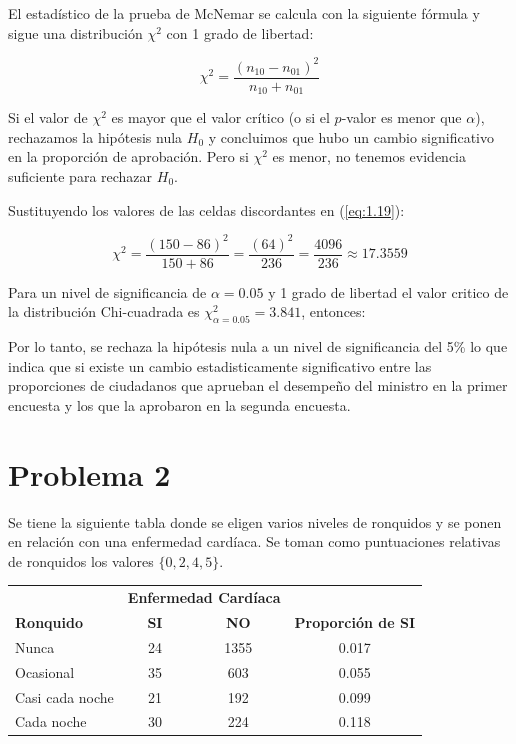 \newpage
El estadístico de la prueba de McNemar se calcula con la siguiente fórmula y sigue una distribución $\chi^2$ con 1 grado de libertad:

\begin{equation}
    \chi^2 = \frac{(n_{10} - n_{01})^2}{n_{10} + n_{01}}
    \label{eq:1.19}
\end{equation}

Si el valor de $\chi^2$ es mayor que el valor crítico (o si el $p$-valor es menor que $\alpha$), rechazamos la hipótesis nula $H_0$ y concluimos que hubo un cambio significativo en la proporción de aprobación. Pero si $\chi^2$ es menor, no tenemos evidencia suficiente para rechazar $H_0$.

Sustituyendo los valores de las celdas discordantes en (\ref{eq:1.19}):

\begin{equation*}
    \chi^2 = \frac{(150 - 86)^2}{150 + 86} = \frac{(64)^2}{236} = \frac{4096}{236}\approx 17.3559
\end{equation*}

Para un nivel de significancia de $\alpha=0.05$ y 1 grado de libertad el valor critico de la distribución Chi-cuadrada es $\chi^2_{\alpha=0.05}=3.841$, entonces:

\begin{center}
\end{center}

Por lo tanto, se rechaza la hipótesis nula a un nivel de significancia del 5\% lo que indica que si existe un cambio estadisticamente significativo entre las proporciones de ciudadanos que aprueban el desempeño del ministro en la primer encuesta y los que la aprobaron en la segunda encuesta.

\newpage

\section*{Problema \textcolor{CIMATRed}{2}}

Se tiene la siguiente tabla donde se eligen varios niveles de ronquidos y se ponen en relación con una enfermedad cardíaca. Se toman como puntuaciones relativas de ronquidos los valores $\{0, 2, 4, 5\}$.

\begin{center}
\begin{tabular}{lccc}
\toprule
& \multicolumn{2}{c}{\textbf{Enfermedad Cardíaca}} & \\
\cmidrule(lr){2-3}
\textbf{Ronquido} & \textbf{SI} & \textbf{NO} & \textbf{Proporción de SI} \\
\midrule
Nunca & 24 & 1355 & 0.017 \\
Ocasional & 35 & 603 & 0.055 \\
Casi cada noche & 21 & 192 & 0.099 \\
Cada noche & 30 & 224 & 0.118 \\
\bottomrule
\end{tabular}
\end{center}

